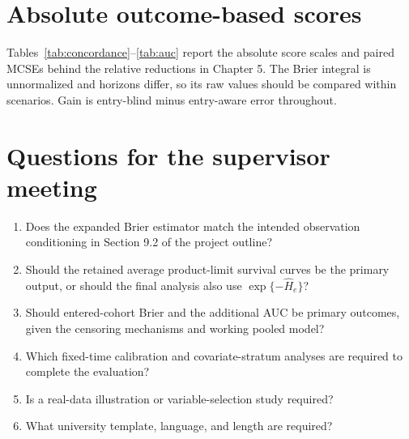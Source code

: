 \section{Absolute outcome-based scores}
Tables~\ref{tab:concordance}--\ref{tab:auc} report the absolute score
scales and paired MCSEs behind the relative reductions in Chapter 5.
The Brier integral is unnormalized and horizons differ, so its raw
values should be compared within scenarios. Gain is entry-blind minus
entry-aware error throughout.




\clearpage
\section{Questions for the supervisor meeting}
\begin{enumerate}
\item Does the expanded Brier estimator match the intended observation
conditioning in Section 9.2 of the project outline?
\item Should the retained average product-limit survival curves be the
primary output, or should the final analysis also use
$\exp\{-\widehat H_e\}$?
\item Should entered-cohort Brier and the additional AUC be primary
outcomes, given the censoring mechanisms and working pooled model?
\item Which fixed-time calibration and covariate-stratum analyses are
required to complete the evaluation?
\item Is a real-data illustration or variable-selection study required?
\item What university template, language, and length are required?
\end{enumerate}
